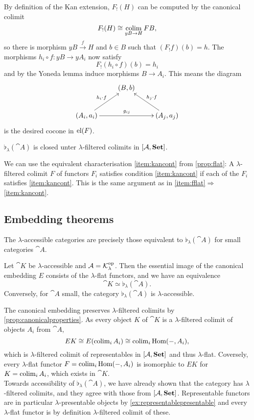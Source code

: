 \begin{Proof}
By definition of the Kan extension, $F_!(H)$ can be computed by the canonical colimit 
\[ F_!(H) \cong \operatorname*{colim}_{yB \to H} FB, \]
so there is morphism $yB \xrightarrow{f} H$ and $b \in B$ such that $(F_!f)(b) = h$. The morphisms $h_i\circ f : yB \to yA_i$ now satisfy
\[ F_!(h_i \circ f)(b) = h_i \]
and by the Yoneda lemma induce morphisms $B \to A_i$. This means the diagram
\[
\xymatrix{
& (B,b) & \\
(A_i,a_i) \ar[ru]^{h_i \circ f} \ar[rr]^{g_{ij}} & & (A_j,a_j) \ar[lu]_{h_j \circ f} 
}\]
is the desired cocone in $\textrm{el}(F)$.
\end{Proof}

\begin{Corollary}
$\flat_\lambda(\cat A)$ is closed unter $\lambda$-filtered colimits in $[\mathcal{A},\mathbf{Set}]$.
\end{Corollary}
\begin{Proof}
We can use the equivalent characterisation \ref{item:kancont} from \ref{prop:flat}: A $\lambda$-filtered colimit $F$ of functors $F_i$ satisfies condition \ref{item:kancont} if each of the $F_i$ satisfies \ref{item:kancont}. This is the same argument as in \ref{item:fflat}$\Rightarrow$\ref{item:kancont}.
\end{Proof}

\subsection{Embedding theorems}

The $\lambda$-accessible categories are precisely those equivalent to $\flat_\lambda(\cat A)$ for small categories $\cat A$.

\begin{Proposition}
Let $\cat K$ be $\lambda$-accessible and $\mathcal{A} = \mathcal{K}^{\textrm{op}}_\lambda$. Then the essential image of the canonical embedding $E$ consists of the $\lambda$-flat functors, and we have an equivalence
\[ \cat K \simeq \flat_\lambda(\cat A). \]
Conversely, for $\cat A$ small, the category $\flat_\lambda(\cat A)$ is $\lambda$-accessible.
\end{Proposition}
\begin{Proof}
The canonical embedding preserves $\lambda$-filtered colimits by 
\ref{prop:canonicalproperties}. As every object $K$ of $\cat K$ is a $\lambda$-filtered colimit of objects $A_i$ from $\cat A$, 
\[ EK \cong E(\operatorname{colim}_i A_i) \cong \operatorname{colim}_i \textrm{Hom}(-,A_i), \]
which is $\lambda$-filtered colimit of representables in $[\mathcal{A},\mathbf{Set}]$ and thus $\lambda$-flat. Coversely, every $\lambda$-flat functor $F=\operatorname{colim}_i \textrm{Hom}(-,A_i)$ is isomorphic to $EK$ for $K=\operatorname{colim}_i A_i$, which exists in $\cat K$. \\

Towards accessibility of $\flat_\lambda(\cat A)$, we have already shown that the category has $\lambda$-filtered colimits, and they agree with those from $[\mathcal{A},\mathbf{Set}]$. Representable functors are in particular $\lambda$-presentable objects by \ref{ex:representablepresentable} and every $\lambda$-flat functor is by definition $\lambda$-filtered colimit of these. 
\end{Proof}


